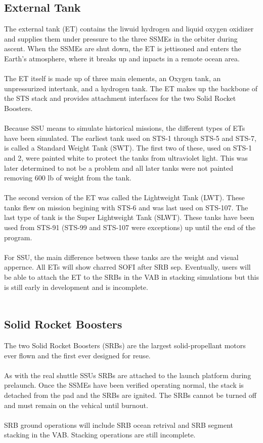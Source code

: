 \documentclass[13pt, letter,final]{article}
\begin{document}
\begin{multicols}{2}
\subsection*{\large External Tank}
The external tank (ET) contains the liwuid hydrogen and liquid oxygen oxidizer and supplies them under pressure to the three SSMEs in the orbiter during ascent. When the SSMEs are shut down, the ET is jettisoned and enters the Earth's atmosphere, where it breaks up and inpacts in a remote ocean area.\\
\\
The ET itself is made up of three main elements, an Oxygen tank, an unpressurized intertank, and a hydrogen tank.  The ET makes up the backbone of the STS stack and provides attachment interfaces for the two Solid Rocket Boosters.\\
\\
Because SSU means to simulate historical missions, the different types of ETs have been simulated. The earliest tank used on STS-1 through STS-5 and STS-7, is called a Standard Weight Tank (SWT). The first two of these, used on STS-1 and 2, were painted white to protect the tanks from ultraviolet light.  This was later determined to not be a problem and all later tanks were not painted removing 600 lb of weight from the tank.\\
\\
The second version of the ET was called the Lightweight Tank (LWT).  These tanks flew on mission begining with STS-6 and was last used on STS-107.  The last type of tank is the Super Lightweight Tank (SLWT).  These tanks have been used from STS-91 (STS-99 and STS-107 were exceptions) up until the end of the program.\\
\\
For SSU, the main difference between these tanks are the weight and visual appernce.  All ETs will show charred SOFI after SRB sep. Eventually, users will be able to attach the ET to the SRBs in the VAB in stacking simulations but this is still early in development and is incomplete.\\
\\
\subsection*{\large Solid Rocket Boosters}
The two Solid Rocket Boosters (SRBs) are the largest solid-propellant motors ever flown and the first ever designed for reuse.\\
\\
As with the real shuttle SSUs SRBs are attached to the launch platform during prelaunch.  Once the SSMEs have been verified operating normal, the stack is detached from the pad and the SRBs are ignited. The SRBs cannot be turned off and must remain on the vehical until burnout.\\
\\
SRB ground operations will include SRB ocean retrival and SRB segment stacking in the VAB. Stacking operations are still incomplete.

\end{multicols}
\end{document}
